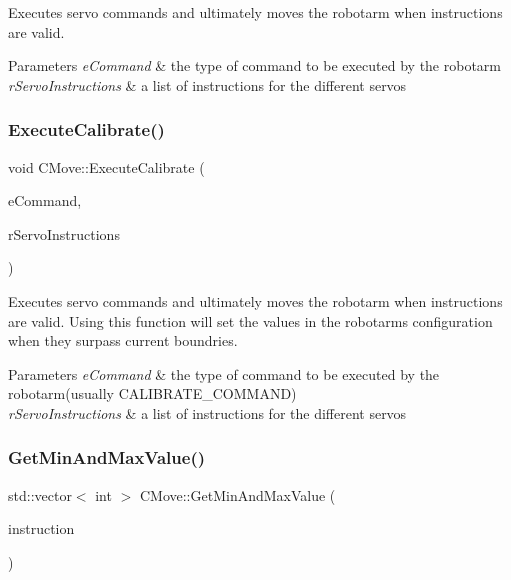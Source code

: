 Executes servo commands and ultimately moves the robotarm when instructions are valid. 


\begin{DoxyParams}{Parameters}
{\em e\+Command} & the type of command to be executed by the robotarm \\
\hline
{\em r\+Servo\+Instructions} & a list of instructions for the different servos \\
\hline
\end{DoxyParams}
\mbox{\label{classCMove_a9fdfeec108cc173657146525cdf48824}} 
\subsubsection{\texorpdfstring{Execute\+Calibrate()}{ExecuteCalibrate()}}
{\footnotesize\ttfamily void C\+Move\+::\+Execute\+Calibrate (\begin{DoxyParamCaption}\item[{e\+Command}]{e\+Command,  }\item[{std\+::vector$<$ std\+::shared\+\_\+ptr$<$ \hyperlink{classCServoInstruction}{C\+Servo\+Instruction} $>$$>$}]{r\+Servo\+Instructions }\end{DoxyParamCaption})}



Executes servo commands and ultimately moves the robotarm when instructions are valid. Using this function will set the values in the robotarms configuration when they surpass current boundries. 


\begin{DoxyParams}{Parameters}
{\em e\+Command} & the type of command to be executed by the robotarm(usually C\+A\+L\+I\+B\+R\+A\+T\+E\+\_\+\+C\+O\+M\+M\+A\+N\+D) \\
\hline
{\em r\+Servo\+Instructions} & a list of instructions for the different servos \\
\hline
\end{DoxyParams}
\mbox{\label{classCMove_ae34b579c70c71a761af9245db1b7571e}} 
\subsubsection{\texorpdfstring{Get\+Min\+And\+Max\+Value()}{GetMinAndMaxValue()}}
{\footnotesize\ttfamily std\+::vector$<$ int $>$ C\+Move\+::\+Get\+Min\+And\+Max\+Value (\begin{DoxyParamCaption}\item[{std\+::shared\+\_\+ptr$<$ \hyperlink{classCServoInstruction}{C\+Servo\+Instruction} $>$}]{instruction }\end{DoxyParamCaption})}



